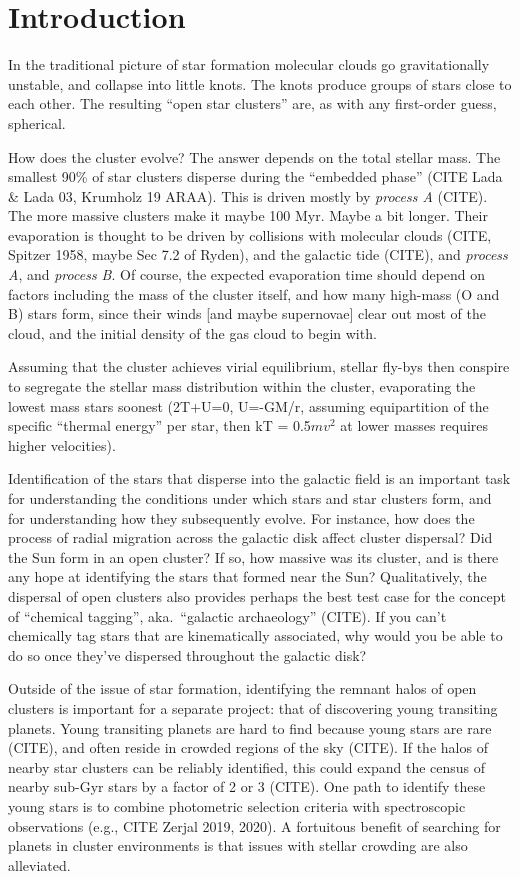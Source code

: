 \documentclass[12pt,twocolumn,tighten]{aastex63}
\begin{document}
\section{Introduction}

In the traditional picture of star formation molecular clouds go
gravitationally unstable, and collapse into little knots.  The knots
produce groups of stars close to each other.  The resulting ``open star
clusters'' are, as with any first-order guess, spherical.

How does the cluster evolve?  The answer depends on the total stellar
mass.  The smallest 90\% of star clusters disperse during the ``embedded
phase'' (CITE Lada \& Lada 03, Krumholz 19 ARAA).  This is driven mostly
by {\it process A} (CITE).  The more massive clusters make it maybe 100
Myr. Maybe a bit longer.  Their evaporation is thought to be driven by
collisions with molecular clouds (CITE, Spitzer 1958, maybe Sec 7.2 of
Ryden), and the galactic tide (CITE), and {\it process A}, and {\it
process B}.  Of course, the expected evaporation time should depend on
factors including the mass of the cluster itself, and how many high-mass
(O and B) stars form, since their winds [and maybe supernovae] clear out
most of the cloud, and the initial density of the gas cloud to begin
with.

Assuming that the cluster achieves virial equilibrium, stellar fly-bys
then conspire to segregate the stellar mass distribution within the
cluster, evaporating the lowest mass stars soonest (2T+U=0, U=-GM/r,
assuming equipartition of the specific ``thermal energy'' per star, then
kT = 0.5$mv^2$ at lower masses requires higher velocities).  

Identification of the stars that disperse into the galactic field is an
important task for understanding the conditions under which stars and
star clusters form, and for understanding how they subsequently evolve.
For instance, how does the process of radial migration across the
galactic disk affect cluster dispersal?  Did the Sun form in an open
cluster? If so, how massive was its cluster, and is there any hope at
identifying the stars that formed near the Sun?  Qualitatively, the
dispersal of open clusters also provides perhaps the best test case for
the concept of ``chemical tagging'', aka.\ ``galactic archaeology''
(CITE).  If you can't chemically tag stars that are kinematically
associated, why would you be able to do so once they've dispersed
throughout the galactic disk?

Outside of the issue of star formation, identifying the remnant halos of
open clusters is important for a separate project: that of discovering
young transiting planets.  Young transiting planets are hard to find
because young stars are rare (CITE), and often reside in crowded regions
of the sky (CITE).  If the halos of nearby star clusters can be reliably
identified, this could expand the census of nearby sub-Gyr stars by a
factor of 2 or 3 (CITE).  
One path to identify these young stars is to combine photometric
selection criteria with spectroscopic observations (e.g., CITE Zerjal
2019, 2020).
A fortuitous benefit of searching for planets
in cluster environments is that issues with stellar crowding are also
alleviated.
\end{document}
